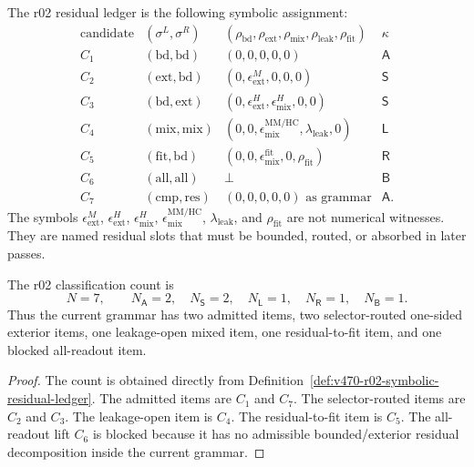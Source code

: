 \begin{definition}
\label{def:v470-r02-symbolic-residual-ledger}
The r02 residual ledger is the following symbolic assignment:
\[
\begin{array}{c|c|c|c}
\text{candidate} & (\sigma^L,\sigma^R) &
(\rho_{\mathrm{bd}},\rho_{\mathrm{ext}},\rho_{\mathrm{mix}},
\rho_{\mathrm{leak}},\rho_{\mathrm{fit}}) & \kappa \\
\hline
C_1 & (\mathrm{bd},\mathrm{bd}) & (0,0,0,0,0) & \mathsf A \\
C_2 & (\mathrm{ext},\mathrm{bd}) & (0,\epsilon^{M}_{\mathrm{ext}},0,0,0) & \mathsf S \\
C_3 & (\mathrm{bd},\mathrm{ext}) & (0,\epsilon^{H}_{\mathrm{ext}},\epsilon^{H}_{\mathrm{mix}},0,0) & \mathsf S \\
C_4 & (\mathrm{mix},\mathrm{mix}) & (0,0,\epsilon^{\mathrm{MM/HC}}_{\mathrm{mix}},\lambda_{\mathrm{leak}},0) & \mathsf L \\
C_5 & (\mathrm{fit},\mathrm{bd}) & (0,0,\epsilon^{\mathrm{fit}}_{\mathrm{mix}},0,\rho_{\mathrm{fit}}) & \mathsf R \\
C_6 & (\mathrm{all},\mathrm{all}) & \bot & \mathsf B \\
C_7 & (\mathrm{cmp},\mathrm{res}) & (0,0,0,0,0)\text{ as grammar} & \mathsf A.
\end{array}
\]
The symbols \(\epsilon^{M}_{\mathrm{ext}}\), \(\epsilon^{H}_{\mathrm{ext}}\),
\(\epsilon^{H}_{\mathrm{mix}}\), \(\epsilon^{\mathrm{MM/HC}}_{\mathrm{mix}}\),
\(\lambda_{\mathrm{leak}}\), and \(\rho_{\mathrm{fit}}\) are not numerical
witnesses.  They are named residual slots that must be bounded, routed, or
absorbed in later passes.
\end{definition}

\begin{proposition}
\label{prop:v470-r02-classification-count}
The r02 classification count is
\[
N=7,\qquad
N_{\mathsf A}=2,
\quad
N_{\mathsf S}=2,
\quad
N_{\mathsf L}=1,
\quad
N_{\mathsf R}=1,
\quad
N_{\mathsf B}=1.
\]
Thus the current grammar has two admitted items, two selector-routed one-sided
exterior items, one leakage-open mixed item, one residual-to-fit item, and one
blocked all-readout item.
\end{proposition}

\begin{proof}
The count is obtained directly from Definition~\ref{def:v470-r02-symbolic-residual-ledger}.
The admitted items are \(C_1\) and \(C_7\).  The selector-routed items are
\(C_2\) and \(C_3\).  The leakage-open item is \(C_4\).  The residual-to-fit
item is \(C_5\).  The all-readout lift \(C_6\) is blocked because it has no
admissible bounded/exterior residual decomposition inside the current grammar.
\end{proof}

